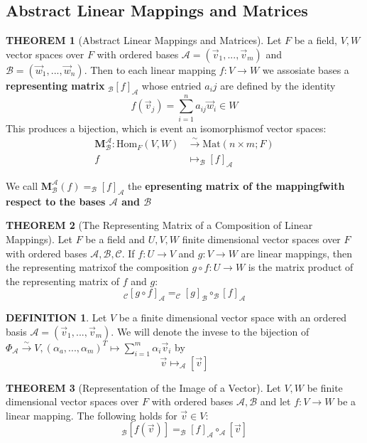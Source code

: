 \documentclass[12pt]{article}
\theoremstyle{definition}
\newtheorem{definition}{DEFINITION}[subsection]
\newtheorem{theorem}{THEOREM}[subsection]
\newcommand{\Hom}{\text{Hom}}
\newcommand{\Mat}{\text{Mat}}
\newcommand{\vect}[1]{\overrightarrow{#1}}
\begin{document}
\subsection{Abstract Linear Mappings and Matrices}
\begin{theorem}[Abstract  Linear  Mappings  and  Matrices]
    Let $F$ be a field, $V,W$ vector spaces over $F$ with ordered bases $\mathcal{A} = (\vect{v}_1,...,\vect{v}_m)$ and $\mathcal{B} = (\vect{w}_1,...,\vect{w}_n)$. Then to each linear mapping $f:V\rightarrow W$ we assosiate bases a \textbf{representing matrix} $_\mathcal{B}[f]_\mathcal{A}$ whose entried $a_ij$ are defined by the identity $$f(\vect{v}_j) = \sum_{i=1}^n{a_{ij}\vect{w}_i}\in W$$
    This produces a bijection, which is event an isomorphismof vector spaces:
    \[\begin{split}
        \textbf{M}_\mathcal{B}^\mathcal{A}: \Hom_F(V,W) &\stackrel{\sim}{\rightarrow} \Mat(n \times m; F)\\
        f &\mapsto _\mathcal{B}[f]_\mathcal{A} 
    \end{split}\]
\end{theorem}
We call $\textbf{M}_\mathcal{B}^\mathcal{A}(f) = _\mathcal{B}[f]_\mathcal{A}$ the \textbf{epresenting matrix of the mappingfwith respect to the bases $\mathcal{A}$ and $\mathcal{B}$}

\begin{theorem}[The Representing Matrix of a Composition of Linear Mappings]
    Let $F$ be a field and $U,V,W$ finite dimensional vector spaces over $F$ with ordered bases $\mathcal{A,B,C}$. If $f:U\rightarrow V$ and $g:V \rightarrow W$ are linear mappings, then the representing matrixof the composition $g \circ f: U \rightarrow W$ is the matrix product of the representing matrix of $f$ and $g$: $$_\mathcal{C}[g\circ f]_\mathcal{A} = _\mathcal{C}[g]_\mathcal{B} \circ _\mathcal{B}[f]_\mathcal{A}$$
\end{theorem}

\begin{definition}
    Let $V$ be a finite dimensional vector space with an ordered basis $\mathcal{A} = (\vect{v}_1,...,\vect{v}_m)$. We will denote the invese to the bijection of $\Phi_\mathcal{A} \stackrel{\sim}{\rightarrow} V,(\alpha_a,...,\alpha_m)^T \mapsto \sum_{i=1}^m{\alpha_i\vect{v}_i}$ by
    $$\vect{v} \mapsto _\mathcal{A}[\vect{v}]$$
\end{definition}

\begin{theorem}[Representation of the Image of a Vector]
    Let $V,W$ be finite dimensional vector spaces over $F$ with ordered bases $\mathcal{A,B}$ and let $f:V\rightarrow W$ be a linear mapping. The following holds for $\vect{v} \in V$:
    $$_\mathcal{B}[f(\vect{v})] = _\mathcal{B}[f]_\mathcal{A} \circ _\mathcal{A}[\vect{v}]$$
\end{theorem}
\end{document}
